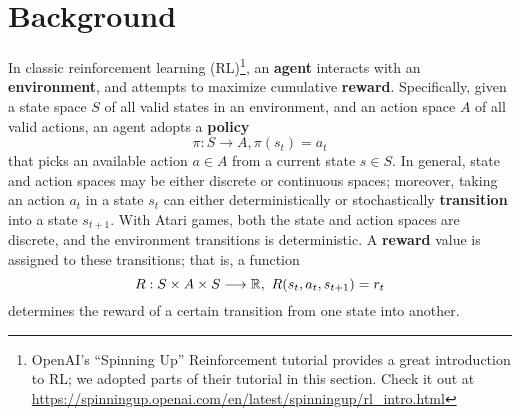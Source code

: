 \documentclass{article} %
\begin{document}
\section{Background}

In classic reinforcement learning (RL)\footnote{OpenAI's ``Spinning Up'' Reinforcement tutorial
provides a great introduction to RL; we adopted parts of their tutorial in this section. Check it
out at \url{https://spinningup.openai.com/en/latest/spinningup/rl_intro.html}}, an \textbf{agent}
interacts with an \textbf{environment}, and attempts to maximize cumulative \textbf{reward}.
Specifically, given a state space $S$ of all valid states in an environment, and an action space $A$
of all valid actions, an agent adopts a
\textbf{policy} \[
  \pi: S\longrightarrow A, \pi(s_t)=a_t
\] that picks an available action $a\in A$ from a current state $s \in S$. In general, state and
action spaces may be either discrete or continuous spaces; moreover, taking an action $a_t$ in a
state $s_t$ can either deterministically or stochastically \textbf{transition} into a state
$s_{t+1}$. With Atari games, both the state and action spaces are discrete, and the environment
transitions is deterministic. A \textbf{reward} value is assigned to these transitions; that is, a
function \[
  R: S\times A\times S\longrightarrow \mathbb{R},\ R(s_t, a_t, s_{t+1})=r_t
\] determines the reward of a certain transition from one state into another.
\end{document}
